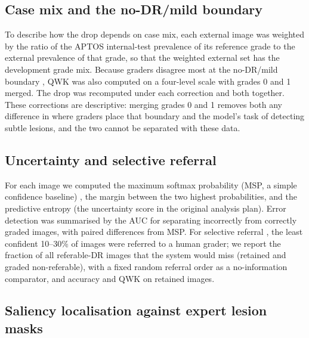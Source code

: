 \documentclass[pdflatex,sn-basic,Numbered]{sn-jnl}
\begin{document}
\subsection{Case mix and the no-DR/mild boundary}\label{sec:decomp}

To describe how the drop depends on case mix, each external image was weighted by the ratio of the APTOS internal-test prevalence of its reference grade to the external prevalence of that grade, so that the weighted external set has the development grade mix. Because graders disagree most at the no-DR/mild boundary \cite{krause2018}, QWK was also computed on a four-level scale with grades 0 and 1 merged. The drop was recomputed under each correction and both together. These corrections are descriptive: merging grades 0 and 1 removes both any difference in where graders place that boundary and the model's task of detecting subtle lesions, and the two cannot be separated with these data.

\subsection{Uncertainty and selective referral}

For each image we computed the maximum softmax probability (MSP, a simple confidence baseline) \cite{hendrycks2017baseline}, the margin between the two highest probabilities, and the predictive entropy (the uncertainty score in the original analysis plan). Error detection was summarised by the AUC for separating incorrectly from correctly graded images, with paired differences from MSP. For selective referral \cite{geifman2017selective}, the least confident 10--30\% of images were referred to a human grader; we report the fraction of all referable-DR images that the system would miss (retained and graded non-referable), with a fixed random referral order as a no-information comparator, and accuracy and QWK on retained images.

\subsection{Saliency localisation against expert lesion masks}
\end{document}
